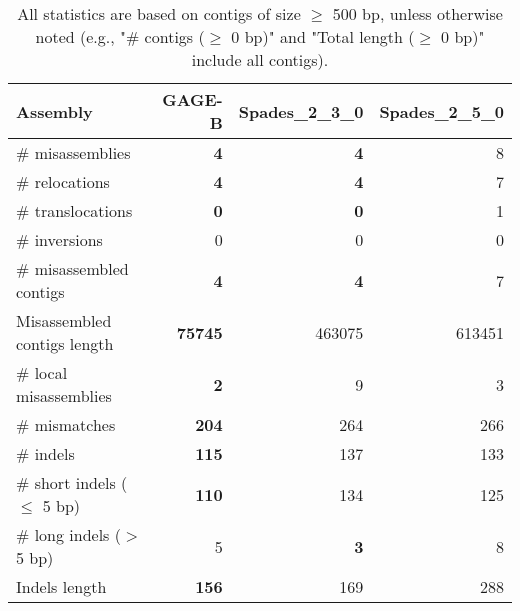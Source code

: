 \documentclass[12pt,a4paper]{article}
\begin{document}
\begin{table}[ht]
\begin{center}
\caption{All statistics are based on contigs of size $\geq$ 500 bp, unless otherwise noted (e.g., "\# contigs ($\geq$ 0 bp)" and "Total length ($\geq$ 0 bp)" include all contigs).}
\begin{tabular}{|l*{3}{|r}|}
\hline
Assembly & GAGE-B & Spades\_2\_3\_0 & Spades\_2\_5\_0 \\ \hline
\# misassemblies & {\bf 4} & {\bf 4} & 8 \\ \hline
\hspace{5mm}\# relocations & {\bf 4} & {\bf 4} & 7 \\ \hline
\hspace{5mm}\# translocations & {\bf 0} & {\bf 0} & 1 \\ \hline
\hspace{5mm}\# inversions & 0 & 0 & 0 \\ \hline
\# misassembled contigs & {\bf 4} & {\bf 4} & 7 \\ \hline
Misassembled contigs length & {\bf 75745} & 463075 & 613451 \\ \hline
\# local misassemblies & {\bf 2} & 9 & 3 \\ \hline
\# mismatches & {\bf 204} & 264 & 266 \\ \hline
\# indels & {\bf 115} & 137 & 133 \\ \hline
\hspace{5mm}\# short indels ($\leq$ 5 bp) & {\bf 110} & 134 & 125 \\ \hline
\hspace{5mm}\# long indels ($>$ 5 bp) & 5 & {\bf 3} & 8 \\ \hline
Indels length & {\bf 156} & 169 & 288 \\ \hline
\end{tabular}
\end{center}
\end{table}
\end{document}
